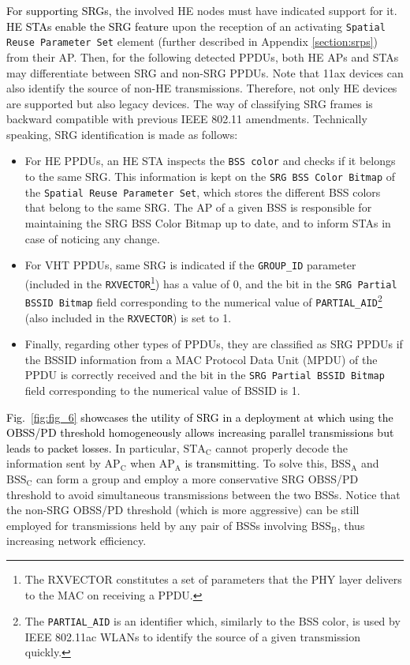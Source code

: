 \documentclass{ieeeaccess}
\begin{document}
\textcolor{black}{For supporting SRGs,} the involved HE nodes must have indicated support for it. \textcolor{black}{HE STAs enable the SRG feature} upon the reception of an activating \texttt{Spatial Reuse Parameter Set} element (further described in Appendix \ref{section:srps}) from their AP. Then, for the following detected PPDUs, both HE APs and STAs may differentiate between SRG and non-SRG PPDUs. Note that 11ax devices can also identify the source of non-HE transmissions. Therefore, not only HE devices are supported but also legacy devices. The way of classifying SRG frames is backward compatible with previous IEEE 802.11 amendments. Technically speaking, SRG identification is made as follows:
\begin{itemize}
	\item For HE PPDUs, an HE STA inspects the \texttt{BSS color} and checks if it belongs to the same SRG. This information is kept on the \texttt{SRG BSS Color Bitmap} of the \texttt{Spatial Reuse Parameter Set}, which stores the different BSS colors that belong to the same SRG. The AP of a given BSS is responsible for maintaining the SRG BSS Color Bitmap up to date, and to inform STAs in case of noticing any change.
    \item For VHT PPDUs, same SRG is indicated if the \texttt{GROUP\_ID} parameter (included in the \texttt{RXVECTOR}\footnote{The RXVECTOR constitutes a set of parameters that the PHY layer delivers to the MAC on receiving a PPDU.}) has a value of 0, and the bit in the \texttt{SRG Partial BSSID Bitmap} field corresponding to the numerical value of \texttt{PARTIAL\_AID}\footnote{The \texttt{PARTIAL\_AID} is an identifier which, similarly to the BSS color, is used by IEEE 802.11ac WLANs to identify the source of a given transmission quickly.} (also included in the \texttt{RXVECTOR}) is set to 1. 
	\item Finally, regarding other types of PPDUs, they are classified as SRG PPDUs if the BSSID information from a MAC Protocol Data Unit (MPDU) of the PPDU is correctly received and the bit in the \texttt{SRG Partial BSSID Bitmap} field corresponding to the numerical value of BSSID is 1.
\end{itemize}

\textcolor{black}{Fig.~\ref{fig:fig_6} showcases the utility of SRG in a deployment at which using the OBSS/PD threshold homogeneously allows increasing parallel transmissions but leads to packet losses.} In particular, $\text{STA}_\text{C}$ cannot properly decode the information sent by $\text{AP}_\text{C}$ when $\text{AP}_\text{A}$ \textcolor{black}{is transmitting}. To solve this, $\text{BSS}_\text{A}$ and $\text{BSS}_\text{C}$ can form a group and employ a more conservative SRG OBSS/PD threshold to avoid simultaneous transmissions between the two BSSs. Notice that the non-SRG OBSS/PD threshold (which is more aggressive) can be still employed for transmissions held by any pair of BSSs involving $\text{BSS}_\text{B}$, thus increasing network efficiency. %
\end{document}
